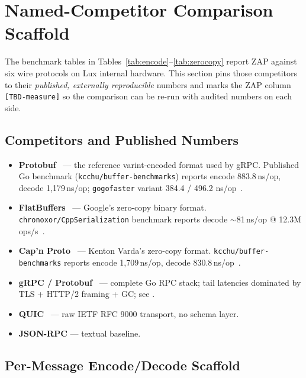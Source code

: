 \section{Named-Competitor Comparison Scaffold}
\label{sec:zap-named-comp}

The benchmark tables in Tables~\ref{tab:encode}--\ref{tab:zerocopy}
report ZAP against six wire protocols on Lux internal hardware.
This section pins those competitors to their \emph{published, externally
reproducible} numbers and marks the ZAP column \texttt{[TBD-measure]} so
the comparison can be re-run with audited numbers on each side.

\subsection{Competitors and Published Numbers}

\begin{itemize}
  \item \textbf{Protobuf}~\cite{protobuf} --- the reference varint-encoded
        format used by gRPC. Published Go benchmark
        (\texttt{kcchu/buffer-benchmarks}) reports encode 883.8\,ns/op,
        decode 1{,}179\,ns/op; \texttt{gogofaster} variant 384.4 / 496.2
        ns/op~\cite{kcchubuffer}.
  \item \textbf{FlatBuffers}~\cite{flatbuf} --- Google's zero-copy
        binary format. \texttt{chronoxor/CppSerialization} benchmark
        reports decode $\sim$81\,ns/op @ 12.3M ops/s~\cite{chronoxorbench}.
  \item \textbf{Cap'n Proto}~\cite{capnp} --- Kenton Varda's zero-copy
        format. \texttt{kcchu/buffer-benchmarks} reports encode
        1{,}709\,ns/op, decode 830.8\,ns/op~\cite{kcchubuffer}.
  \item \textbf{gRPC / Protobuf}~\cite{grpc,protobuf} --- complete
        Go RPC stack; tail latencies dominated by TLS + HTTP/2 framing
        + GC; see \cite{grpcperformance}.
  \item \textbf{QUIC}~\cite{quic} --- raw IETF RFC 9000 transport,
        no schema layer.
  \item \textbf{JSON-RPC} --- textual baseline.
\end{itemize}

\subsection{Per-Message Encode/Decode Scaffold}

